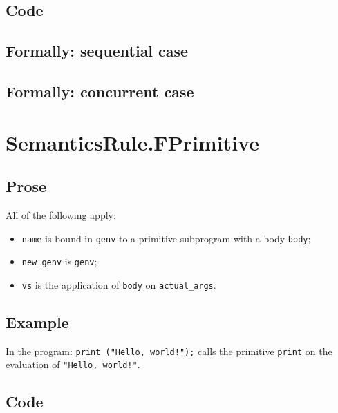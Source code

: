 \documentclass{book}
\begin{document}
  \subsection{Code}

\begin{emptyformal}
  \subsection{Formally: sequential case}

  \subsection{Formally: concurrent case}
\end{emptyformal}


\section{SemanticsRule.FPrimitive \label{sec:SemanticsRule.FPrimitive}}

  \subsection{Prose}
  All of the following apply:
  \begin{itemize}
  \item \texttt{name} is bound in \texttt{genv} to a primitive subprogram with a body \texttt{body};
  \item \texttt{new\_genv} is \texttt{genv};
  \item \texttt{vs} is the application of \texttt{body} on \texttt{actual\_args}.
  \end{itemize}

  \subsection{Example}
  In the program:
  \texttt{print ("Hello, world!");} calls the primitive \texttt{print} on the evaluation of \texttt{"Hello, world!"}.

  \subsection{Code}
\end{document}
